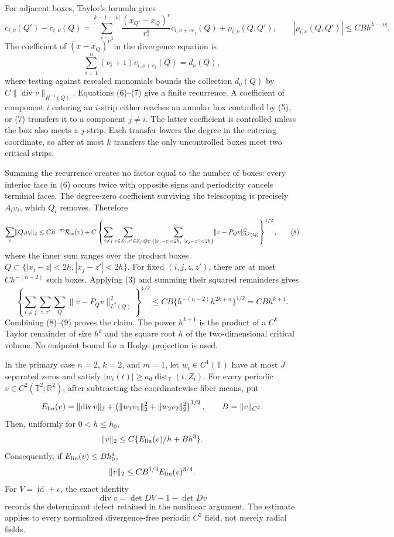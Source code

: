 For adjacent boxes, Taylor's formula gives
\[
 c_{i,\nu}(Q')-c_{i,\nu}(Q)
 =\sum_{r=1}^{k-1-|\nu|}
   \frac{(x_{Q'}-x_Q)^r}{r!}c_{i,\nu+r e_j}(Q)
   +\rho_{i,\nu}(Q,Q'),
 \qquad
 |\rho_{i,\nu}(Q,Q')|\leq C B h^{k-|\nu|}.
\tag{6}
\]
The coefficient of \((x-x_Q)^\nu\) in the divergence equation is
\[
 \sum_{i=1}^n(\nu_i+1)c_{i,\nu+e_i}(Q)=d_\nu(Q),
\tag{7}
\]
where testing against rescaled monomials bounds the collection \(d_\nu(Q)\) by \(C\lVert\operatorname {div}v\rVert_{H^{-1}(Q)}\).  Equations (6)--(7) give a finite recurrence.  A coefficient of component \(i\) entering an \(i\)-strip either reaches an annular box controlled by (5), or (7) transfers it to a component \(j\neq i\).  The latter coefficient is controlled unless the box also meets a \(j\)-strip.  Each transfer lowers the degree in the entering coordinate, so after at most \(k\) transfers the only uncontrolled boxes meet two critical strips.

Summing the recurrence creates no factor equal to the number of boxes: every interior face in (6) occurs twice with opposite signs and periodicity cancels terminal faces.  The degree-zero coefficient surviving the telescoping is precisely \(A_iv_i\), which \(Q_i\) removes.  Therefore
\[
 \sum_i\lVert Q_iv_i\rVert_2
 \leq C h^{-m}{\cal R}_w(v)
 +C\left\{\sum_{i\neq j}\sum_{z\in Z_i,z'\in Z_j}
   \sum_{Q\subset\{|x_i-z|<2h,\ |x_j-z'|<2h\}}
   \lVert v-P_Qv\rVert_{L^2(Q)}^2\right\}^{1/2},
\tag{8}
\]
where the inner sum ranges over the product boxes \(Q\subset\{|x_i-z|<2h,|x_j-z'|<2h\}\).  For fixed \((i,j,z,z')\), there are at most \(C h^{-(n-2)}\) such boxes.  Applying (3) and summing their squared remainders gives
\[
 \left\{\sum_{i\neq j}\sum_{z,z'}\sum_Q
   \lVert v-P_Qv\rVert_{L^2(Q)}^2\right\}^{1/2}
 \leq C B\{h^{-(n-2)}h^{2k+n}\}^{1/2}
 =C B h^{k+1}.
\tag{9}
\]
Combining (8)--(9) proves the claim.  The power \(h^{k+1}\) is the product of a \(C^k\) Taylor remainder of size \(h^k\) and the square root \(h\) of the two-dimensional critical volume.  No endpoint bound for a Hodge projection is used.

In the primary case \(n=2\), \(k=2\), and \(m=1\), let \(w_i\in C^1(\mathbb T)\) have at most \(J\) separated zeros and satisfy \(|w_i(t)|\geq a_0\operatorname {dist}_{\mathbb T}(t,Z_i)\).  For every periodic \(v\in C^2(\mathbb T^2;\mathbb R^2)\), after subtracting the coordinatewise fiber means, put
\[
 E_{\rm lin}(v)=\lVert\operatorname {div}v\rVert_2+
 \left(\lVert w_1v_1\rVert_2^2+\lVert w_2v_2\rVert_2^2\right)^{1/2},
 \qquad B=\lVert v\rVert_{C^2}.
\]
Then, uniformly for \(0<h\leq h_0\),
\[
 \lVert v\rVert_2\leq C\{E_{\rm lin}(v)/h+Bh^3\}.
\]
Consequently, if \(E_{\rm lin}(v)\leq Bh_0^4\),
\[
 \lVert v\rVert_2\leq C B^{1/4}E_{\rm lin}(v)^{3/4}.
\]
For \(V=\operatorname {id}+v\), the exact identity
\[
 \operatorname {div}v=\det DV-1-\det Dv
\]
records the determinant defect retained in the nonlinear argument.  The estimate applies to every normalized divergence-free periodic \(C^2\) field, not merely radial fields.

